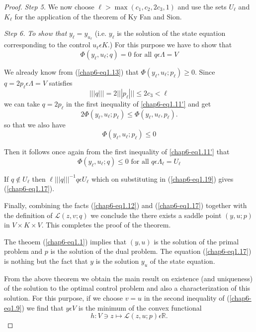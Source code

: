 \begin{proof}
{\em Step 5.} We now choose $\ell > \max (c_{1}, c_{2}, 2c_{3}, 1)$ and use the sets $U_{\ell}$ and $K_{\ell}$ for the application of the theorem of Ky Fan and Sion.

{\em Step 6.}  {\em To show that} $y_{\ell} = y_{u_{\ell}}$ (i.e. $y_{\ell}$ is the solution of the state equation corresponding to the control $u_{\ell} \epsilon K.$) For this purpose we have to show that
\begin{equation*}
\Phi (y_{\ell}, u_{\ell} ; q) = 0 \text{ for all } q \epsilon \Lambda = V\tag{1.17}\label{chap6-eq1.17}
\end{equation*}

We already know from (\ref{chap6-eq1.13}) that $\Phi (y_{\ell}, u_{\ell} ; p_{\ell}) \geq 0$. Since $q = 2p_{\ell} \epsilon \Lambda = V$ satisfies
$$
|||q||| = 2|||p_{\ell}||| \leq 2c_{3} < \ell
$$
we can take $q = 2p_{\ell}$ in the first inequality of \ref{chap6-eq1.11'} and get
$$
2\Phi (y_{\ell}, u_{\ell} ; p_{\ell}) \leq \Phi (y_{\ell}, u_{\ell}, p_{\ell}).
$$
so that we also have
\begin{equation*}
\Phi (y_{\ell}, u_{\ell} ; p_{\ell}) \leq 0 \tag{1.18}\label{chap6-eq1.18}
\end{equation*}\pageoriginale

Then it follows once again from the first inequality of \ref{chap6-eq1.11'} that
\begin{equation*}
\Phi (y_{\ell}, u_{\ell} ; q) \leq 0 \text{ for all } q \epsilon \Lambda_{\ell} = U_{\ell}\tag{1.19}\label{chap6-eq1.19}
\end{equation*}

If $q \notin U_{\ell}$ then $\ell |||q|||^{-1} q \epsilon U_{\ell}$
which on substituting in (\ref{chap6-eq1.19}) gives
(\ref{chap6-eq1.17}). 

Finally, combining the facts (\ref{chap6-eq1.12}) and
(\ref{chap6-eq1.17}) together with the definition of $\mathscr{L}(z, v ;
q)$ we conclude the there exists a saddle point $(y, u ; p)$ in $V
\times K \times V$. This completes the proof of the theorem. 

The theoem (\ref{chap6-eq1.1}) implies that $(y, u)$ is the solution of
the primal problem and $p$ is the solution of the dual problem. The
equation (\ref{chap6-eq1.17}) is nothing but the fact that $y$ is the
solution $y_{u}$ of the state equation. 

From the above theorem we obtain the main result on existence (and
uniqueness) of the solution to the optimal control problem and also a
characterization of this solution. For this purpose, if we choose $v =
u$ in the second inequality of (\ref{chap6-eq1.9}) we find that $y
\epsilon V$ is the minimum of the convex functional 
$$
h : V \ni z \mapsto \mathscr{L} (z, u ; p) \epsilon \mathbb{R}.
$$


\end{proof}
